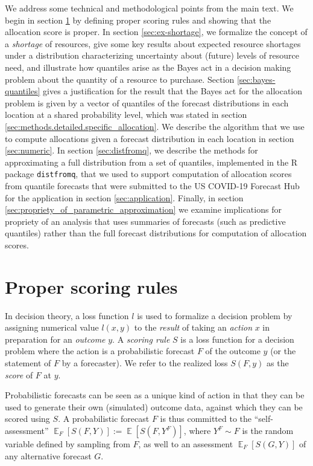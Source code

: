 \documentclass{article}\usepackage[]{graphicx}\usepackage[]{xcolor}
\DeclareMathOperator{\Ex}{\mathbb{E}}
\begin{document}
We address some technical and methodological points from the main text. We begin in section \ref{sec:proper} by defining
proper scoring rules and showing that the allocation score is proper. In section \ref{sec:ex-shortage}, we formalize the
concept of a \emph{shortage} of resources, give some key results about expected resource shortages under a distribution
characterizing uncertainty about (future) levels of resource need, and illustrate how quantiles arise as the Bayes act
in a decision making problem about the quantity of a resource to purchase. Section \ref{sec:bayes-quantiles} gives a
justification for the result that the Bayes act for the allocation problem is given by a vector of quantiles of the
forecast distributions in each location at a shared probability level, which was stated in section
\ref{sec:methods.detailed.specific_allocation}. We describe the algorithm that we use to compute allocations given a
forecast distribution in each location in section \ref{sec:numeric}. In section \ref{sec:distfromq}, we describe the
methods for approximating a full distribution from a set of quantiles, implemented in the R package \verb`distfromq`,
that we used to support computation of allocation scores from quantile forecasts that were submitted to the US COVID-19
Forecast Hub for the application in section \ref{sec:application}. Finally, in section
\ref{sec:propriety_of_parametric_approximation} we examine implications for propriety of an analysis that uses summaries
of forecasts (such as predictive quantiles) rather than the full forecast distributions for computation of allocation
scores.

\section{Proper scoring rules}
\label{sec:proper}

In decision theory, a loss function $l$ is used to formalize a decision problem by assigning numerical value $l(x,y)$ to
the \emph{result} of taking an \emph{action} $x$ in preparation for an \emph{outcome} $y$. A \emph{scoring rule} $S$ is
a loss function for a decision problem where the action is a probabilistic forecast $F$ of the outcome $y$ (or the
statement of $F$ by a forecaster). We refer to the realized loss $S(F,y)$ as the \emph{score} of $F$ at $y$.

Probabilistic forecasts can be seen as a unique kind of action in that they can be used to generate their own
(simulated) outcome data, against which they can be scored using $S$. A probabilistic forecast $F$ is thus committed to
the ``self-assessment'' $\Ex_F [S(F, Y)] := \Ex [S(F, Y^F)]$, where $Y^F \sim F$ is the random variable defined by
sampling from $F$, as well to an assessment $\Ex_F [S(G, Y)]$ of any alternative forecast $G$.
\end{document}
